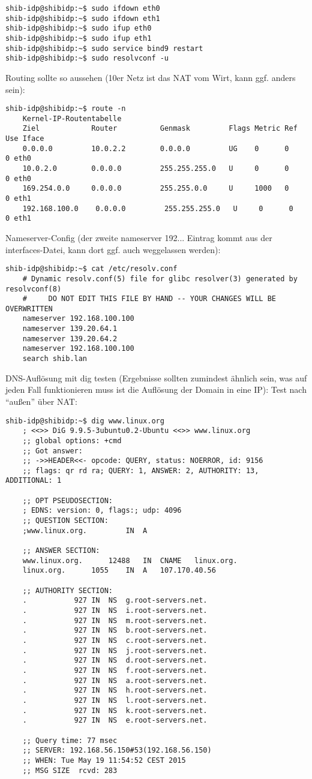 \begin{lstlisting}
shib-idp@shibidp:~$ sudo ifdown eth0
shib-idp@shibidp:~$ sudo ifdown eth1
shib-idp@shibidp:~$ sudo ifup eth0
shib-idp@shibidp:~$ sudo ifup eth1
shib-idp@shibidp:~$ sudo service bind9 restart
shib-idp@shibidp:~$ sudo resolvconf -u
\end{lstlisting}				
Routing sollte so aussehen (10er Netz ist das NAT vom Wirt, kann ggf. anders sein):
\begin{lstlisting}		
shib-idp@shibidp:~$ route -n
	Kernel-IP-Routentabelle
	Ziel            Router          Genmask         Flags Metric Ref    Use Iface
	0.0.0.0         10.0.2.2        0.0.0.0         UG    0      0        0 eth0
	10.0.2.0        0.0.0.0         255.255.255.0   U     0      0        0 eth0
	169.254.0.0     0.0.0.0         255.255.0.0     U     1000   0        0 eth1
	192.168.100.0    0.0.0.0         255.255.255.0   U     0      0        0 eth1
\end{lstlisting}
Nameserver-Config (der zweite nameserver 192... Eintrag kommt aus der interfaces-Datei, kann dort ggf. auch weggelassen werden):
\begin{lstlisting}
shib-idp@shibidp:~$ cat /etc/resolv.conf 
	# Dynamic resolv.conf(5) file for glibc resolver(3) generated by resolvconf(8)
	#     DO NOT EDIT THIS FILE BY HAND -- YOUR CHANGES WILL BE OVERWRITTEN
	nameserver 192.168.100.100
	nameserver 139.20.64.1
	nameserver 139.20.64.2
	nameserver 192.168.100.100
	search shib.lan
\end{lstlisting}
DNS-Auflösung mit dig testen (Ergebnisse sollten zumindest ähnlich sein, was auf jeden Fall funktionieren muss ist die Auflösung der Domain in eine IP):
 Test nach "`außen"' über NAT:
\begin{lstlisting}
shib-idp@shibidp:~$ dig www.linux.org
	; <<>> DiG 9.9.5-3ubuntu0.2-Ubuntu <<>> www.linux.org
	;; global options: +cmd
	;; Got answer:
	;; ->>HEADER<<- opcode: QUERY, status: NOERROR, id: 9156
	;; flags: qr rd ra; QUERY: 1, ANSWER: 2, AUTHORITY: 13, ADDITIONAL: 1
	
	;; OPT PSEUDOSECTION:
	; EDNS: version: 0, flags:; udp: 4096
	;; QUESTION SECTION:
	;www.linux.org.			IN	A
	
	;; ANSWER SECTION:
	www.linux.org.		12488	IN	CNAME	linux.org.
	linux.org.		1055	IN	A	107.170.40.56
	
	;; AUTHORITY SECTION:
	.			927	IN	NS	g.root-servers.net.
	.			927	IN	NS	i.root-servers.net.
	.			927	IN	NS	m.root-servers.net.
	.			927	IN	NS	b.root-servers.net.
	.			927	IN	NS	c.root-servers.net.
	.			927	IN	NS	j.root-servers.net.
	.			927	IN	NS	d.root-servers.net.
	.			927	IN	NS	f.root-servers.net.
	.			927	IN	NS	a.root-servers.net.
	.			927	IN	NS	h.root-servers.net.
	.			927	IN	NS	l.root-servers.net.
	.			927	IN	NS	k.root-servers.net.
	.			927	IN	NS	e.root-servers.net.
	
	;; Query time: 77 msec
	;; SERVER: 192.168.56.150#53(192.168.56.150)
	;; WHEN: Tue May 19 11:54:52 CEST 2015
	;; MSG SIZE  rcvd: 283
				
\end{lstlisting} 
